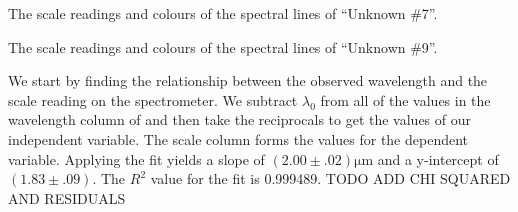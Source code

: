 \begin{paper}
{The scale readings and colours of the spectral lines of ``Unknown \#7''.}\vspace{1em}

{The scale readings and colours of the spectral lines of ``Unknown \#9''.}


We start by finding the relationship between the observed wavelength and the
scale reading on the spectrometer.
We subtract $\lambda_0$ from all of the values in the wavelength column of
\figHelium and then take the reciprocals to get the values of our independent
variable.
The scale column forms the values for the dependent variable.
Applying the fit yields a slope of $(2.00\pm.02)\si{\micro\meter}$ and a
y-intercept of $(1.83\pm.09)$.
The $R^2$ value for the fit is 0.999489.
TODO ADD CHI SQUARED AND RESIDUALS\\


\end{paper}
